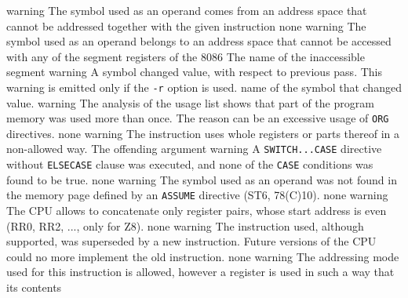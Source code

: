 \documentclass[12pt,twoside]{report}
\newcommand{\tty}[1]{{\tt #1}}
\begin{document}
\begin{description}
               {warning}
               {The symbol used as an operand comes from an address space
                that cannot be addressed together with the given instruction}
               {none}
               {warning}
               {The symbol used as an operand belongs to an address space
                that cannot be accessed with any of the segment registers of
                the 8086}
               {The name of the inaccessible segment}
               {warning}
               {A symbol changed value, with respect to previous pass. This
                warning is emitted only if the \tty{-r} option is used.}
               {name of the symbol that changed value.}
               {warning}
               {The analysis of the usage list shows that part of the
                program memory was used more than once. The reason can be an
                excessive usage of \tty{ORG} directives.}
               {none}
               {warning}
               {The instruction uses whole registers or parts thereof in
                a non-allowed way.}
               {The offending argument}
               {warning}
               {A \tty{SWITCH...CASE} directive without \tty{ELSECASE} clause was
                executed, and none of the \tty{CASE} conditions was found
                to be true.}
               {none}
               {warning}
               {The symbol used as an operand was not found in the memory
                page defined by an \tty{ASSUME} directive (ST6, 78(C)10).}
               {none}
               {warning}
               {The CPU allows to concatenate only register pairs, whose
                start address is even (RR0, RR2, ..., only for Z8).}
               {none}
               {warning}
               {The instruction used, although supported, was superseded by
                a new instruction. Future versions of the CPU could no more
                implement the old instruction.}
               {none}
               {warning}
               {The addressing mode used for this instruction is allowed,
                however a register is used in such a way that its contents
}
\end{description}
\end{document}
